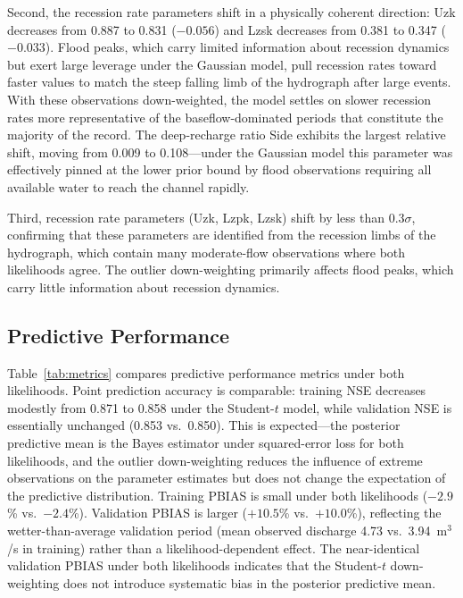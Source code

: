 \documentclass[article,nojss]{jss}
\begin{document}
Second, the recession rate parameters shift in a physically coherent
direction: Uzk decreases from 0.887 to 0.831 ($-0.056$) and Lzsk
decreases from 0.381 to 0.347 ($-0.033$).
Flood peaks, which carry limited information about recession dynamics
but exert large leverage under the Gaussian model, pull recession rates
toward faster values to match the steep falling limb of the hydrograph
after large events.
With these observations down-weighted, the model settles on slower
recession rates more representative of the baseflow-dominated periods
that constitute the majority of the record.
The deep-recharge ratio Side exhibits the largest relative shift,
moving from 0.009 to 0.108---under the Gaussian model this parameter
was effectively pinned at the lower prior bound by flood observations
requiring all available water to reach the channel rapidly.

Third, recession rate parameters (Uzk, Lzpk, Lzsk) shift by less than
0.3$\sigma$, confirming that these parameters are identified from the
recession limbs of the hydrograph, which contain many moderate-flow
observations where both likelihoods agree.
The outlier down-weighting primarily affects flood peaks, which carry
little information about recession dynamics.

\subsection{Predictive Performance}

Table~\ref{tab:metrics} compares predictive performance metrics under
both likelihoods.
Point prediction accuracy is comparable: training NSE decreases
modestly from 0.871 to 0.858 under the Student-$t$ model, while
validation NSE is essentially unchanged (0.853 vs.\ 0.850).
This is expected---the posterior predictive mean is the Bayes estimator
under squared-error loss for both likelihoods, and the outlier
down-weighting reduces the influence of extreme observations on
the parameter estimates but does not change the
expectation of the predictive distribution.
Training PBIAS is small under both likelihoods ($-2.9$\% vs.\ $-2.4$\%).
Validation PBIAS is larger ($+10.5$\% vs.\ $+10.0$\%), reflecting the
wetter-than-average validation period (mean observed discharge 4.73
vs.\ 3.94~m$^{3}$/s in training) rather than a likelihood-dependent
effect.
The near-identical validation PBIAS under both likelihoods indicates
that the Student-$t$ down-weighting does not introduce systematic bias
in the posterior predictive mean.
\end{document}
